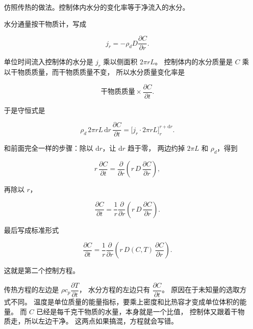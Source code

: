 仿照传热的做法。控制体内水分的变化率等于净流入的水分。

水分通量按干物质计，写成

\begin{equation}
j_r = -\rho_d D\frac{\partial C}{\partial r}.
\end{equation}

单位时间流入控制体的水分是 $j_r$ 乘以侧面积 $2\pi rL$。
控制体内的水分质量是 $C$ 乘以干物质质量，而干物质质量不变，
所以水分质量变化率是

\begin{equation}
\text{干物质质量}\times\frac{\partial C}{\partial t}.
\end{equation}

于是守恒式是

\begin{equation}
\rho_d\,2\pi rL\,\mathrm{d}r\,\frac{\partial C}{\partial t}
= \Big[j_r\cdot 2\pi rL\Big]_{r}^{r+\mathrm{d}r}.
\end{equation}

和前面完全一样的步骤：除以 $\mathrm{d}r$，让 $\mathrm{d}r$ 趋于零，
两边约掉 $2\pi L$ 和 $\rho_d$，得到

\begin{equation}
r\,\frac{\partial C}{\partial t}
= \frac{\partial}{\partial r}\left(r\,D\,\frac{\partial C}{\partial r}\right),
\end{equation}

再除以 $r$，

\begin{equation}
\frac{\partial C}{\partial t}
= \frac{1}{r}\frac{\partial}{\partial r}\left(r\,D\,\frac{\partial C}{\partial r}\right).
\end{equation}

最后写成标准形式

\begin{equation}
\boxed{\;
\frac{\partial C}{\partial t}
= \frac{1}{r}\frac{\partial}{\partial r}\left(r\,D(C,T)\,\frac{\partial C}{\partial r}\right).
\;}
\label{eq:mass}
\end{equation}

这就是第二个控制方程。

传热方程的左边是 $\rho c_p\dfrac{\partial T}{\partial t}$，
水分方程的左边只有 $\dfrac{\partial C}{\partial t}$。
原因在于未知量的选取方式不同。
温度是单位质量的能量指标，要乘上密度和比热容才变成单位体积的能量。
而 $C$ 已经是每千克干物质的水量，本身就是一个比值，
控制体又跟着干物质走，所以左边干净。
这两点如果搞混，方程就会写错。

